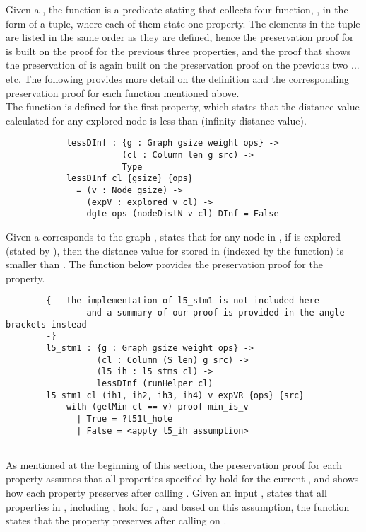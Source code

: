 Given a  , the function  is a predicate stating that collects four function, , in the form of a tuple, where each of them state one  property. The elements in the tuple are listed in the same order as they are defined, hence the preservation proof for  is built on the proof for the previous three properties, and the proof that shows the preservation of  is again built on the preservation proof on the previous two ... etc. The following provides more detail on the definition and the corresponding preservation proof for each function mentioned above. 
\\ 

The function  is defined for the first property, which states that the distance value calculated for any explored node is less than (infinity distance value).
\begin{lstlisting}
			lessDInf : {g : Graph gsize weight ops} ->
			           (cl : Column len g src) ->
			           Type
			lessDInf cl {gsize} {ops}
			  = (v : Node gsize) ->
			    (expV : explored v cl) ->
			    dgte ops (nodeDistN v cl) DInf = False
\end{lstlisting}

Given a   corresponds to the graph ,  states that for any node  in , if  is explored (stated by ), then the distance value for  stored in (indexed by the  function) is smaller than . The  function below provides the preservation proof for the  property. 
\begin{lstlisting}
		{-  the implementation of l5_stm1 is not included here 
				and a summary of our proof is provided in the angle brackets instead
		-}
		l5_stm1 : {g : Graph gsize weight ops} ->
		          (cl : Column (S len) g src) ->
		          (l5_ih : l5_stms cl) ->
		          lessDInf (runHelper cl)
		l5_stm1 cl (ih1, ih2, ih3, ih4) v expVR {ops} {src} 
			with (getMin cl == v) proof min_is_v
			  | True = ?l51t_hole
			  | False = <apply l5_ih assumption>
         
\end{lstlisting}

As mentioned at the beginning of this section, the preservation proof for each property assumes that all properties specified by  hold for the current , and shows how each property preserves after calling . Given an input ,  states that all properties in , including , hold for , and based on this assumption, the function  states that the  property preserves after calling  on .
\\

